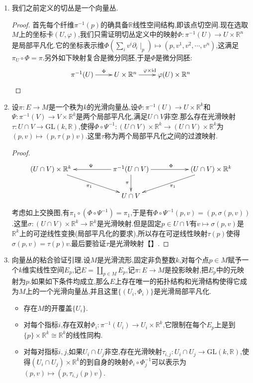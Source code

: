 \begin{enumerate}
	\item 我们之前定义的切丛是一个向量丛.
	\begin{proof}
		
		首先每个纤维$\pi^{-1}(p)$的确具备$\mathbb{R}$线性空间结构,即该点切空间.现在选取$M$上的坐标卡$(U,\varphi)$,我们只需证明切丛定义中的映射$\Phi:\pi^{-1}(U)\to U\times\mathbb{R}^n$是局部平凡化.它的坐标表示维$\Phi(\sum_iv^i\partial_i\mid_p)\mapsto(p,v^1,v^2,\cdots,v^n)$,这满足$\pi_U\circ\Phi=\pi$.另外如下映射复合是微分同胚,于是$\Phi$是微分同胚:
		$$\xymatrix{\pi^{-1}(U)\ar[r]^{\Phi}&U\times\mathbb{R}^n\ar[r]^{\varphi\times\mathrm{id}}&\varphi(U)\times\mathbb{R}^n}$$
	\end{proof}
    \item 设$\pi:E\to M$是一个秩为$k$的光滑向量丛,设$\Phi:\pi^{-1}(U)\to U\times\mathbb{R}^k$和$\Psi:\pi^{-1}(V)\to V\times\mathbb{R}^k$是两个局部平凡化,满足$U\cap V$非空.那么存在光滑映射$\tau:U\cap V\to\mathrm{GL}(k,\mathbb{R})$,使得$\Phi\circ\Psi^{-1}:(U\cap V)\times\mathbb{R}^k\to(U\cap V)\times\mathbb{R}^k$为$(p,v)\mapsto(p,\tau(p)v)$.这里$\tau$称为两个局部平凡化之间的过渡映射.
    \begin{proof}
    	
    	$$\xymatrix{(U\cap V)\times\mathbb{R}^k\ar[drr]_{\pi_1}&&\pi^{-1}(U\cap V)\ar[ll]_{\Psi}\ar[d]_{\pi}\ar[rr]^{\Phi}&&(U\cap V)\times\mathbb{R}^k\ar[dll]^{\pi_1}\\&&U\cap V&&}$$
    	
    	考虑如上交换图,有$\pi_1\circ(\Phi\circ\Psi^{-1})=\pi_1$,于是有$\Phi\circ\Psi^{-1}(p,v)=(p,\sigma(p,v))$.这里$\sigma:(U\cap V)\times\mathbb{R}^k\to\mathbb{R}^k$是光滑映射.但是固定$p\in U\cap V$有$v\mapsto\sigma(p,v)$是$\mathbb{R}^k$上的可逆线性变换(局部平凡化的要求),所以存在可逆线性映射$\tau(p)$使得$\sigma(p,v)=\tau(p)v$.最后要验证$\tau$是光滑映射【】.
    \end{proof}
    \item 向量丛的粘合验证引理.设$M$是光滑流形,固定非负整数$k$,对每个点$p\in M$赋予一个$k$维实线性空间$E_p$,记$E=\coprod_{p\in M}E_p$,记$\pi:E\to M$是投影映射,把$E_p$中的元映射为$p$.如果如下条件均成立,那么$E$上存在唯一的拓扑结构和光滑结构使得它成为$M$上的一个光滑向量丛,并且这里$\{(U_i,\Phi_i)\}$是光滑局部平凡化.
    \begin{itemize}
    	\item 存在$M$的开覆盖$\{U_i\}$.
    	\item 对每个指标$i$,存在双射$\Phi_i:\pi^{-1}(U_i)\to U_i\times\mathbb{R}^k$,它限制在每个$E_p$上是到$\{p\}\times\mathbb{R}^k\cong\mathbb{R}^k$的线性同构.
    	\item 对每对指标$i,j$,如果$U_i\cap U_j$非空,存在光滑映射$\tau_{i,j}:U_i\cap U_j\to\mathrm{GL}(k,\mathbb{R})$,使得$(U_i\cap U_j)\times\mathbb{R}^k$的到自身的映射$\Phi_i\circ\Phi_j^{-1}$可以表示为$(p,v)\mapsto(p,\tau_{i,j}(p)v)$.
    \end{itemize}
\end{enumerate}

